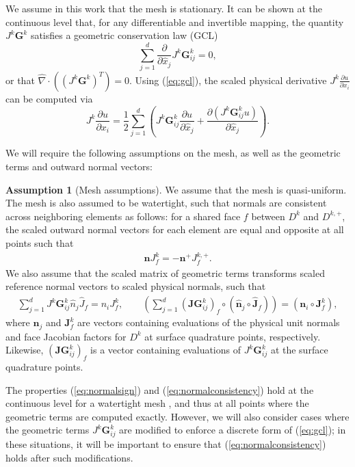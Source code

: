 \documentclass[preprint,10pt]{article}
\theoremstyle{definition}
\theoremstyle{lemma}
\theoremstyle{theorem}
\theoremstyle{assumption}
\newtheorem{assumption}{Assumption}
\renewcommand{\hat}{\widehat}
\newcommand{\pd}[2]{\frac{\partial#1}{\partial#2}}
\newcommand{\LRp}[1]{\left( #1 \right)}
\newcommand{\Grad} {\ensuremath{\nabla}}
\begin{document}
{We assume in this work that the mesh is stationary.  It can be shown at the continuous level that, for any differentiable and invertible mapping, the quantity $J^k\bm{G}^k$ satisfies a geometric conservation law (GCL) \cite{kopriva2006metric, thomas1979geometric}
\begin{equation}
\sum_{j=1}^d\pd{}{\hat{x}_j}J^k\bm{G}^k_{ij} = 0,
\label{eq:gcl}
\end{equation}
or that $\hat{\Grad}\cdot \LRp{\LRp{J^k\bm{G}^k}^T} = 0$.  Using (\ref{eq:gcl}), the scaled physical derivative $J^k\pd{u}{x_i}$ can be computed via
\begin{equation}
J^k\pd{u}{x_i} = \frac{1}{2}\sum_{j=1}^d \LRp{J^k\bm{G}^k_{ij}\pd{u}{\hat{x}_j} + \pd{\LRp{J^k\bm{G}^k_{ij}u}}{\hat{x}_j}}.
\label{eq:splitderiv}
\end{equation}

We will require the following assumptions on the mesh, as well as the geometric terms and outward normal vectors:
\begin{assumption}[Mesh assumptions]
We assume that the mesh is quasi-uniform.  The mesh is also assumed to be watertight, such that normals are consistent across neighboring elements as follows: for a shared face $f$ between $D^k$ and $D^{k,+}$, the scaled outward normal vectors for each element are equal and opposite at all points such that 
\begin{align}
\bm{n}J^k_f = -\bm{n}^+J^{k,+}_f.
\label{eq:normalsign}
\end{align}
We also assume that the scaled matrix of geometric terms transforms scaled reference normal vectors to scaled physical normals, such that
\begin{align}
\sum_{j=1}^d J^k\bm{G}^k_{ij} \hat{n}_j\hat{J}_f = n_i J^k_f, \qquad \LRp{\sum_{j=1}^d \LRp{\bm{JG}^k_{ij}}_f \circ\LRp{\hat{\bm{n}}_j\circ\hat{\bm{J}}_f}}
= \LRp{\bm{n}_i\circ\bm{J}^k_f},
\label{eq:normalconsistency}
\end{align}
where $\bm{n}_j$ and $\bm{J}^k_f$ are vectors containing evaluations of the physical unit normals and face Jacobian factors for $D^k$ at surface quadrature points, respectively.
Likewise, $\LRp{\bm{JG}^k_{ij}}_f$ is a vector containing evaluations of $J^k\bm{G}^k_{ij}$ at the surface quadrature points.
\label{ass:norm}
\end{assumption}
The properties (\ref{eq:normalsign}) and (\ref{eq:normalconsistency}) hold at the continuous level for a watertight mesh \cite{ciarlet1978finite}, and thus at all points where the geometric terms are computed exactly.  However, we will also consider cases where the geometric terms $J^k\bm{G}^k_{ij}$ are modified to enforce a discrete form of (\ref{eq:gcl}); in these situations, it will be important to ensure that (\ref{eq:normalconsistency}) holds after such modifications.  

}
\end{document}
